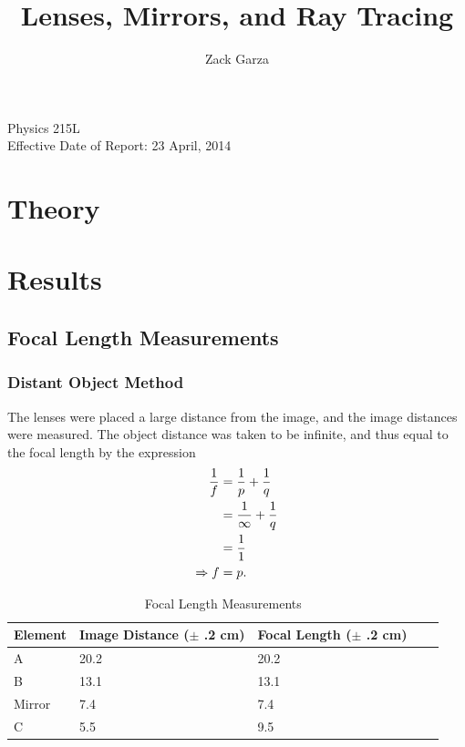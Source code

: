 \documentclass[twocolumn,english]{IEEEtran}
\theoremstyle{plain}
\theoremstyle{plain}
\begin{document}
\title{Lenses, Mirrors, and Ray Tracing}


\author{Zack Garza}


\IEEEspecialpapernotice
{Physics 215L \\
Effective Date of Report: 23 April, 2014 }



\maketitle

\tableofcontents


\section{Theory}

\section{Results}

\subsection{Focal Length Measurements}

\subsubsection{Distant Object Method}

The lenses were placed a large distance from the image, and the image distances were measured. The object distance was taken to be infinite, and thus equal to the focal length by the expression
\begin{align}
	\frac{1}{f} &= \frac{1}{p} + \frac{1}{q} \notag \\
	&= \frac{1}{\infty} + \frac{1}{q} \notag \\
	&= \frac{1}{1} \notag \\
	\Rightarrow f &= p.
\end{align}

\begin{table}[H]
	\caption{Focal Length Measurements}
	\label{tb:focal_length}
	\centering
	\begin{tabular}{@{}lllll@{}}
	\toprule
	Element	& Image Distance ($\pm$ .2 cm) 	& Focal Length ($\pm$ .2 cm)  \\ \midrule
	A 		& 20.2			& 20.2 	\\
	B 		& 13.1 			& 13.1 	\\
	Mirror 	& 7.4  			& 7.4 	\\
	C 		& 5.5			& 9.5 	\\ \bottomrule
	\end{tabular}
\end{table}
\end{document}
